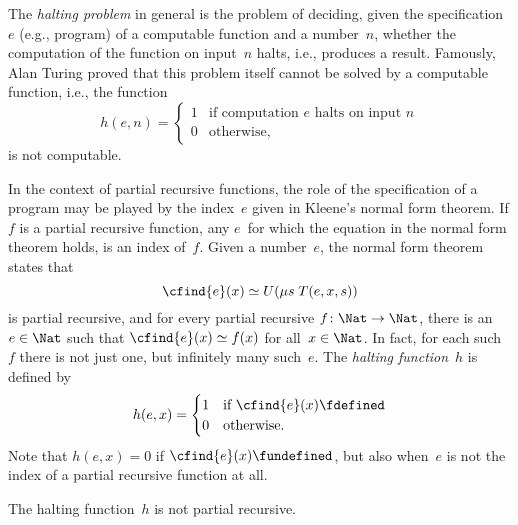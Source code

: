 \documentclass[../../../include/open-logic-section]{subfiles}
\begin{document}

The \emph{halting problem} in general is the problem of deciding,
given the specification~$e$ (e.g., program) of a computable function
and a number~$n$, whether the computation of the function on input~$n$
halts, i.e., produces a result.  Famously, Alan Turing proved that
this problem itself cannot be solved by a computable function, i.e.,
the function
\[
h(e, n) =
\begin{cases}
1 & \text{if computation $e$ halts on input $n$}\\
0 & \text{otherwise,}
\end{cases}
\]
is not computable.

In the context of partial recursive functions, the role of the
specification of a program may be played by the index~$e$ given in
Kleene's normal form theorem.  If $f$ is a partial recursive function,
any $e$~for which the equation in the normal form theorem holds, is an
index of~$f$. Given a number~$e$, the normal form theorem states that
\[
\cfind{e}(x) \simeq U(\mu s \; T(e, x, s))
\]
is partial recursive, and for every partial recursive $f\colon \Nat
\to \Nat$, there is an $e \in \Nat$ such that $\cfind{e}(x) \simeq
f(x)$ for all~$x \in \Nat$.  In fact, for each such $f$ there is not
just one, but infinitely many such~$e$.  The \emph{halting function}~$h$
is defined by
\[
h(e, x) =
\begin{cases}
1 & \text{if $\cfind{e}(x) \fdefined$}\\
0 & \text{otherwise.}
\end{cases}
\]
Note that $h(e, x) = 0$ if $\cfind{e}(x) \fundefined$, but also
when~$e$ is not the index of a partial recursive function at all.

\begin{thm}
The halting function~$h$ is not partial recursive.
\end{thm}
\end{document}
